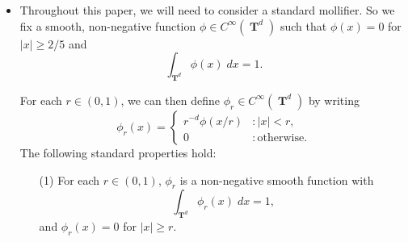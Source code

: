 \documentclass[12pt,reqno]{article}
\numberwithin{equation}{section}
\DeclareMathOperator{\TT}{\mathbf{T}}
\newtheorem{theorem}{Theorem}
\numberwithin{theorem}{section}
\begin{document}
\begin{itemize}
\begin{comment}
    \end{comment}


    \item Throughout this paper, we will need to consider a standard mollifier. So we fix a smooth, non-negative function $\phi \in C^\infty(\TT^d)$ such that $\phi(x) = 0$ for $|x| \geq 2/5$ and
%
\[ \int_{\TT^d} \phi(x)\; dx = 1. \]
%
\begin{comment}
\begin{theorem} \label{equationASFGCISIX}
    There exists a smooth probability density $\phi \in C^\infty(\TT^d)$ such that $\phi(x) = 0$ for $|x| \geq 2/5$, and such that for each $x \in \TT^d$
    \[ \sum_{k \in \{ 0, 1 \}^d} \phi(x + k/2) = 2^d. \]
\end{theorem}
\begin{proof}
    Let $\psi$ be a non-negative smooth function on $\TT$ such that $\psi(x) = \psi(- x)$ for all $x \in \TT$, $\psi(x) = 1$ for $|x| \leq 1/10$, $\psi(x) = 0$ for $|x| \geq 2/10$, and $0 \leq \psi(x) \leq 1$ for all $x \in \TT$. Then define $\eta$ to be the non-negative, $C^\infty$ function
    \[ \eta(x) = \frac{1}{2} - \frac{\psi(x) + \psi(x + 1/2)}{2}. \]
    If we define
    \[ \phi_0(x) = 2(\psi(x) + \eta(x)), \]
    then $\phi_0(x) + \phi_0(x + 1/2) = 2$ for all $x \in \TT$. Moreover, if $|x| \geq 2/5$, then $\psi(x) = 0$, and since this implies $|x + 1/2| \leq 1/10$, we find $\eta(x) = 0$. Thus $\phi_0(x) = 0$ for $|x| \geq 2/5$. But the condition $\phi_0(x) + \phi_0(x + 1/2) = 2$ implies that $\phi_0$ is a probability density function. Thus it suffices to define
    \[ \phi(x_1, \dots, x_d) = \phi_0(x_1) \dots \phi_0(x_d). \qedhere \]
\end{proof}
\end{comment}
%
For each $r \in (0,1)$, we can then define $\phi_r \in C^\infty(\TT^d)$ by writing
%
\[ \phi_r(x) = \begin{cases} r^{-d} \phi(x/r) &: |x| < r, \\ 0 &: \text{otherwise}. \end{cases} \]
%
The following standard properties hold:
%
\begin{enumerate}
    \item[(1)] For each $r \in (0,1)$, $\phi_r$ is a non-negative smooth function with
    \begin{equation}
        \int_{\TT^d} \phi_r(x)\; dx = 1,
    \end{equation}
    and $\phi_r(x) = 0$ for $|x| \geq r$.


\end{enumerate}
\end{itemize}
\end{document}

